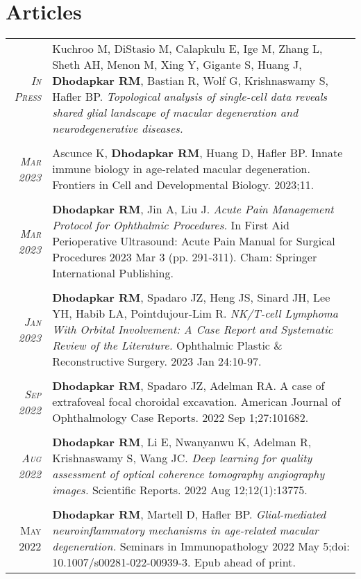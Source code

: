 \documentclass[a4paper,10pt]{article}
\begin{document}
\section{Articles}
\begin{tabular}{rp{11cm}}
 \textit{\textsc{In Press}}& Kuchroo M, DiStasio M, Calapkulu E, Ige M, Zhang L, Sheth AH, Menon M, Xing Y, Gigante S, Huang J, {\bf Dhodapkar RM}, Bastian R, Wolf G, Krishnaswamy S, Hafler BP. {\it Topological analysis of single-cell data reveals shared glial landscape of macular degeneration and neurodegenerative diseases.} \\
\multicolumn{2}{c}{} \\
 \textit{\textsc{Mar} 2023}& Ascunce K, {\bf Dhodapkar RM}, Huang D, Hafler BP. Innate immune biology in age-related macular degeneration. Frontiers in Cell and Developmental Biology. 2023;11.
 \\
\multicolumn{2}{c}{} \\
 \textit{\textsc{Mar} 2023}& {\bf Dhodapkar RM}, Jin A, Liu J. {\it Acute Pain Management Protocol for Ophthalmic Procedures.} In First Aid Perioperative Ultrasound: Acute Pain Manual for Surgical Procedures 2023 Mar 3 (pp. 291-311). Cham: Springer International Publishing.
 \\
\multicolumn{2}{c}{} \\
\textit{\textsc{Jan} 2023}& {\bf Dhodapkar RM}, Spadaro JZ, Heng JS, Sinard JH, Lee YH, Habib LA, Pointdujour-Lim R. {\it NK/T-cell Lymphoma With Orbital Involvement: A Case Report and Systematic Review of the Literature.} Ophthalmic Plastic \& Reconstructive Surgery. 2023 Jan 24:10-97.
 \\
\multicolumn{2}{c}{} \\
 \textit{\textsc{Sep} 2022}& {\bf Dhodapkar RM}, Spadaro JZ, Adelman RA. A case of extrafoveal focal choroidal excavation. American Journal of Ophthalmology Case Reports. 2022 Sep 1;27:101682. \\
\multicolumn{2}{c}{} \\
 \textit{\textsc{Aug 2022}}& {\bf Dhodapkar RM}, Li E, Nwanyanwu K, Adelman R, Krishnaswamy S, Wang JC. {\it Deep learning for quality assessment of optical coherence tomography angiography images.} Scientific Reports. 2022 Aug 12;12(1):13775. \\
\multicolumn{2}{c}{} \\
 \textsc{May} 2022 & {\bf Dhodapkar RM}, Martell D, Hafler BP. {\it Glial-mediated neuroinflammatory mechanisms in age-related macular degeneration.} Seminars in Immunopathology 2022 May 5;doi: 10.1007/s00281-022-00939-3. Epub ahead of print. \\

\end{tabular}
\end{document}
